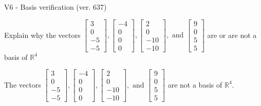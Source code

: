 \begin{exercise}
  \begin{exerciseTitle}V6 - Basis verification (ver. 637)\end{exerciseTitle}
  \begin{exerciseStatement}
    Explain why the vectors \(\left[\begin{array}{r}
3 \\
0 \\
-5 \\
-5
\end{array}\right] , \left[\begin{array}{r}
-4 \\
0 \\
0 \\
0
\end{array}\right] , \left[\begin{array}{r}
2 \\
0 \\
-10 \\
-10
\end{array}\right] , \text{ and } \left[\begin{array}{r}
9 \\
0 \\
5 \\
5
\end{array}\right]\) are or are not a basis of \(\mathbb{R}^4\)	


  \end{exerciseStatement}
  \begin{exerciseAnswer}
   The vectors \(\left[\begin{array}{r}
3 \\
0 \\
-5 \\
-5
\end{array}\right] , \left[\begin{array}{r}
-4 \\
0 \\
0 \\
0
\end{array}\right] , \left[\begin{array}{r}
2 \\
0 \\
-10 \\
-10
\end{array}\right] , \text{ and } \left[\begin{array}{r}
9 \\
0 \\
5 \\
5
\end{array}\right]\) 
  	 are not  a basis of \(\mathbb{R}^4\).
  


  \end{exerciseAnswer}
\end{exercise}